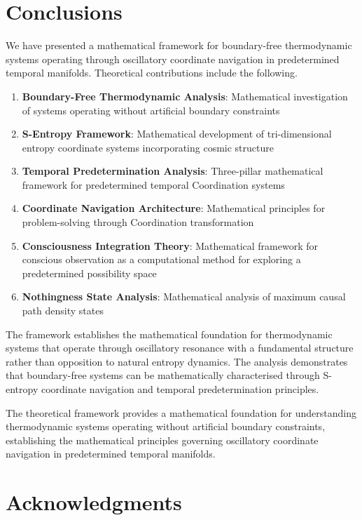 \documentclass[11pt,a4paper]{article}
\theoremstyle{remark}
\begin{document}
\section{Conclusions}

We have presented a mathematical framework for boundary-free thermodynamic systems operating through oscillatory coordinate navigation in predetermined temporal manifolds. Theoretical contributions include the following.

\begin{enumerate}
\item \textbf{Boundary-Free Thermodynamic Analysis}: Mathematical investigation of systems operating without artificial boundary constraints
\item \textbf{S-Entropy Framework}: Mathematical development of tri-dimensional entropy coordinate systems incorporating cosmic structure
\item \textbf{Temporal Predetermination Analysis}: Three-pillar mathematical framework for predetermined temporal Coordination systems
\item \textbf{Coordinate Navigation Architecture}: Mathematical principles for problem-solving through Coordination transformation
\item \textbf{Consciousness Integration Theory}: Mathematical framework for conscious observation as a computational method for exploring a predetermined possibility space
\item \textbf{Nothingness State Analysis}: Mathematical analysis of maximum causal path density states
\end{enumerate}

The framework establishes the mathematical foundation for thermodynamic systems that operate through oscillatory resonance with a fundamental structure rather than opposition to natural entropy dynamics. The analysis demonstrates that boundary-free systems can be mathematically characterised through S-entropy coordinate navigation and temporal predetermination principles.

The theoretical framework provides a mathematical foundation for understanding thermodynamic systems operating without artificial boundary constraints, establishing the mathematical principles governing oscillatory coordinate navigation in predetermined temporal manifolds.

\section*{Acknowledgments}
\end{document}
